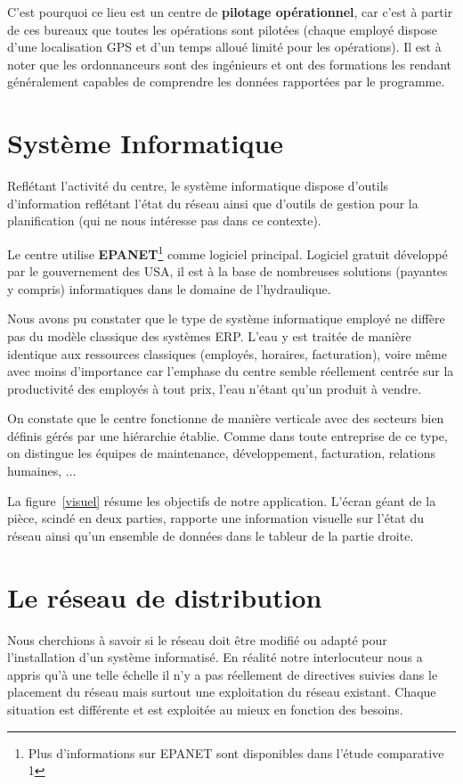 \documentclass[a4paper, 11pt]{article}
\begin{document}
C'est pourquoi ce lieu est un centre de \textbf{pilotage opérationnel}, car c'est à partir de ces bureaux que toutes les opérations sont pilotées (chaque employé dispose d'une localisation GPS et d'un temps alloué limité pour les opérations). Il est à noter que les ordonnanceurs sont des ingénieurs et ont des formations les rendant généralement capables de comprendre les données rapportées par le programme.



\section*{Système Informatique}
Reflétant l'activité du centre, le système informatique dispose d'outils d'information reflétant l'état du réseau ainsi que d'outils de gestion pour la planification (qui ne nous intéresse pas dans ce contexte).

Le centre utilise \textbf{EPANET}\footnote{Plus d'informations sur EPANET sont disponibles dans l'étude comparative 1} comme logiciel principal. Logiciel gratuit développé par le gouvernement des USA, il est à la base de nombreuses solutions (payantes y compris) informatiques dans le domaine de l'hydraulique.

Nous avons pu constater que le type de système informatique employé ne diffère pas du modèle classique des systèmes ERP. L'eau y est traitée de manière identique aux ressources classiques (employés, horaires, facturation), voire même avec moins d'importance car l'emphase du centre semble réellement centrée sur la productivité des employés à tout prix, l'eau n'étant qu'un produit à vendre.

On constate que le centre fonctionne de manière verticale avec des secteurs bien définis gérés par une hiérarchie établie. Comme dans toute entreprise de ce type, on distingue les équipes de maintenance, développement, facturation, relations humaines, ...

La figure~\ref{visuel} résume les objectifs de notre application. L'écran géant de la pièce, scindé en deux parties, rapporte une information visuelle sur l'état du réseau ainsi qu'un ensemble de données dans le tableur de la partie droite.

\section*{Le réseau de distribution}

Nous cherchions à savoir si le réseau doit être modifié ou adapté pour l'installation d'un système informatisé. En réalité notre interlocuteur nous a appris qu'à une telle échelle il n'y a pas réellement de directives suivies dans le placement du réseau mais surtout une exploitation du réseau existant. Chaque situation est différente et est exploitée au mieux en fonction des besoins.
\end{document}
